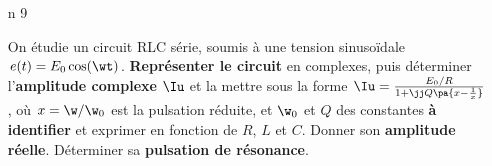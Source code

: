 \documentclass[a4paper, 10pt, final, garamond]{book}
\begin{document}
\begin{enumerate}[label=\sqenumi]
\begin{isd}[]
\begin{center}
		      \end{center}
		      \psw{%
			      \[
				      \Uu \stm{=} \Zu\ind{para}\Iu\ind{para} = \Zu_1\Iu_1
				      \Lra
				      \boxed{
					      \Iu_k \stm{=} \frac{\Zu\ind{para}}{\Zu_k}\Iu\ind{para}
				      }%
			      \]
		      }%
	      \end{isd}
	\item[n]{9}%
	      ~
	      \smallbreak
	      \vspace{-25pt}
	      \begin{isd}[righthand ratio=.25, interior hidden, sidebyside align=top]
		      On étudie un circuit RLC série, soumis à une tension sinusoïdale
		      $e(t) = E_0 \cos(\wt)$. \textbf{Représenter le circuit} en complexes,
		      puis déterminer l'\textbf{amplitude complexe} $\Iu$ et la mettre sous
		      la forme $\Iu = \frac{E_0/R}{1+\jj Q \pa{x-\frac{1}{x}}}$, où $x =
			      \w/\w_0$ est la pulsation réduite, et $\w_0$ et $Q$ des constantes
		      \textbf{à identifier} et exprimer en fonction de $R$, $L$ et $C$.
		      Donner son \textbf{amplitude réelle}. Déterminer sa \textbf{pulsation
			      de résonance}.
		      \tcblower
		      \begin{center}
		      \end{center}

\end{isd}
\end{enumerate}
\end{document}

